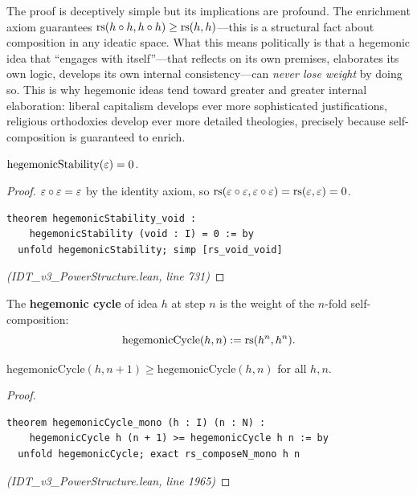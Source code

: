 \begin{remark}
The proof is deceptively simple but its implications are profound. The enrichment
axiom guarantees $\mathrm{rs}(h \circ h, h \circ h) \geq \mathrm{rs}(h,h)$---this is a
structural fact about composition in any ideatic space. What this means politically
is that a hegemonic idea that ``engages with itself''---that reflects on its own
premises, elaborates its own logic, develops its own internal consistency---can
\emph{never lose weight} by doing so. This is why hegemonic ideas tend toward
greater and greater internal elaboration: liberal capitalism develops ever more
sophisticated justifications, religious orthodoxies develop ever more detailed
theologies, precisely because self-composition is guaranteed to enrich.
\end{remark}

\begin{theorem}
\label{thm:hegemonic-stability-void}
$\mathrm{hegemonicStability}(\varepsilon) = 0$.
\end{theorem}

\begin{proof}
$\varepsilon \circ \varepsilon = \varepsilon$ by the identity axiom, so
$\mathrm{rs}(\varepsilon \circ \varepsilon, \varepsilon \circ \varepsilon) = \mathrm{rs}(\varepsilon,\varepsilon) = 0$.
\begin{lstlisting}
theorem hegemonicStability_void :
    hegemonicStability (void : I) = 0 := by
  unfold hegemonicStability; simp [rs_void_void]
\end{lstlisting}
\textit{(IDT\_v3\_PowerStructure.lean, line 731)}
\end{proof}

\begin{definition}
\label{def:hegemonic-cycle}
The \textbf{hegemonic cycle} of idea $h$ at step $n$ is the weight of the
$n$-fold self-composition:
\[
  \mathrm{hegemonicCycle}(h, n) := \mathrm{rs}(h^n, h^n).
\]
\end{definition}

\begin{theorem}
\label{thm:hegemonic-cycle-mono}
$\mathrm{hegemonicCycle}(h, n+1) \geq \mathrm{hegemonicCycle}(h, n)$ for all $h, n$.
\end{theorem}

\begin{proof}
\begin{lstlisting}
theorem hegemonicCycle_mono (h : I) (n : N) :
    hegemonicCycle h (n + 1) >= hegemonicCycle h n := by
  unfold hegemonicCycle; exact rs_composeN_mono h n
\end{lstlisting}
\textit{(IDT\_v3\_PowerStructure.lean, line 1965)}
\end{proof}

